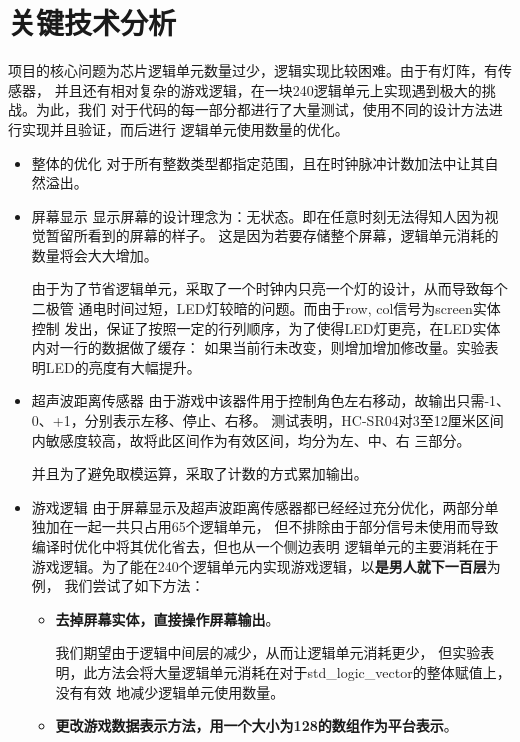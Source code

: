 \documentclass{article}
\begin{document}
\section{关键技术分析}
\begin{spacing}{1.62}

项目的核心问题为芯片逻辑单元数量过少，逻辑实现比较困难。由于有灯阵，有传感器，
并且还有相对复杂的游戏逻辑，在一块240逻辑单元上实现遇到极大的挑战。为此，我们
对于代码的每一部分都进行了大量测试，使用不同的设计方法进行实现并且验证，而后进行
逻辑单元使用数量的优化。

\begin{itemize}
	\item 整体的优化
			对于所有整数类型都指定范围，且在时钟脉冲计数加法中让其自然溢出。
	\item 屏幕显示
		显示屏幕的设计理念为：无状态。即在任意时刻无法得知人因为视觉暂留所看到的屏幕的样子。
		这是因为若要存储整个屏幕，逻辑单元消耗的数量将会大大增加。

		由于为了节省逻辑单元，采取了一个时钟内只亮一个灯的设计，从而导致每个二极管
		通电时间过短，LED灯较暗的问题。而由于row, col信号为screen实体控制
		发出，保证了按照一定的行列顺序，为了使得LED灯更亮，在LED实体内对一行的数据做了缓存：
		如果当前行未改变，则增加增加修改量。实验表明LED的亮度有大幅提升。

	\item 超声波距离传感器
		由于游戏中该器件用于控制角色左右移动，故输出只需-1、0、+1，分别表示左移、停止、右移。
		测试表明，HC-SR04对3至12厘米区间内敏感度较高，故将此区间作为有效区间，均分为左、中、右
		三部分。

		并且为了避免取模运算，采取了计数的方式累加输出。

	\item 游戏逻辑
		由于屏幕显示及超声波距离传感器都已经经过充分优化，两部分单独加在一起一共只占用65个逻辑单元，
		但不排除由于部分信号未使用而导致编译时优化中将其优化省去，但也从一个侧边表明
		逻辑单元的主要消耗在于游戏逻辑。为了能在240个逻辑单元内实现游戏逻辑，以{\bf 是男人就下一百层}为例，
		我们尝试了如下方法：

		\begin{itemize}
			\item {\bf 去掉屏幕实体，直接操作屏幕输出}。
				
				我们期望由于逻辑中间层的减少，从而让逻辑单元消耗更少，
				但实验表明，此方法会将大量逻辑单元消耗在对于std\_logic\_vector的整体赋值上，没有有效
				地减少逻辑单元使用数量。

			\item {\bf 更改游戏数据表示方法，用一个大小为128的数组作为平台表示}。


\end{itemize}
\end{itemize}
\end{spacing}
\end{document}
